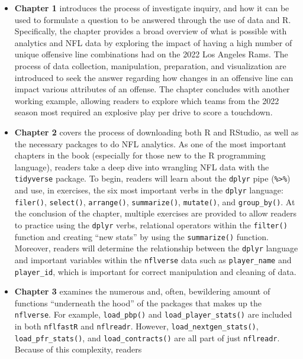 \documentclass[
  letterpaper,
]{krantz}
\begin{document}
\begin{itemize}
\item
  \textbf{Chapter 1} introduces the process of investigate inquiry, and
  how it can be used to formulate a question to be answered through the
  use of data and R. Specifically, the chapter provides a broad overview
  of what is possible with analytics and NFL data by exploring the
  impact of having a high number of unique offensive line combinations
  had on the 2022 Los Angeles Rams. The process of data collection,
  manipulation, preparation, and visualization are introduced to seek
  the answer regarding how changes in an offensive line can impact
  various attributes of an offense. The chapter concludes with another
  working example, allowing readers to explore which teams from the 2022
  season most required an explosive play per drive to score a touchdown.
\item
  \textbf{Chapter 2} covers the process of downloading both R and
  RStudio, as well as the necessary packages to do NFL analytics. As one
  of the most important chapters in the book (especially for those new
  to the R programming language), readers take a deep dive into
  wrangling NFL data with the \texttt{tidyverse} package. To begin,
  readers will learn about the \texttt{dplyr} pipe
  (\texttt{\%\textgreater{}\%}) and use, in exercises, the six most
  important verbs in the \texttt{dplyr} language: \texttt{filer()},
  \texttt{select()}, \texttt{arrange()}, \texttt{summarize()},
  \texttt{mutate()}, and \texttt{group\_by()}. At the conclusion of the
  chapter, multiple exercises are provided to allow readers to practice
  using the \texttt{dplyr} verbs, relational operators within the
  \texttt{filter()} function and creating ``new stats'' by using the
  \texttt{summarize()} function. Moreover, readers will determine the
  relationship between the \texttt{dplyr} language and important
  variables within the \texttt{nflverse} data such as
  \texttt{player\_name} and \texttt{player\_id}, which is important for
  correct manipulation and cleaning of data.
\item
  \textbf{Chapter 3} examines the numerous and, often, bewildering
  amount of functions ``underneath the hood'' of the packages that makes
  up the \texttt{nflverse}. For example, \texttt{load\_pbp()} and
  \texttt{load\_player\_stats()} are included in both \texttt{nflfastR}
  and \texttt{nflreadr}. However, \texttt{load\_nextgen\_stats()},
  \texttt{load\_pfr\_stats()}, and \texttt{load\_contracts()} are all
  part of just \texttt{nflreadr}. Because of this complexity, readers

\end{itemize}
\end{document}
